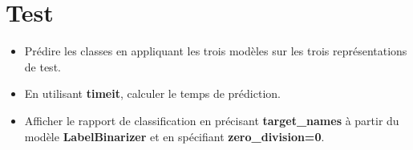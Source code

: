 \documentclass[11pt, a4paper]{article}
\begin{document}
\section{Test}

\begin{itemize}
	\item Prédire les classes en appliquant les trois modèles sur les trois représentations de test.
	\item En utilisant \textbf{timeit}, calculer le temps de prédiction.
	\item Afficher le rapport de classification en précisant \textbf{target\_names} à partir du modèle \textbf{LabelBinarizer} et en spécifiant \textbf{zero\_division=0}.
	
\end{itemize}
\end{document}
